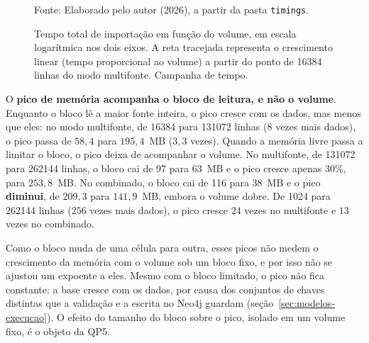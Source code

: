 \begin{figure}[H]
  \centering
  \caption{Tempo total de importação em função do volume, em escala logarítmica nos dois eixos. A reta tracejada representa o crescimento linear (tempo proporcional ao volume) a partir do ponto de \num{16384} linhas do modo multifonte. Campanha de tempo.}
  \label{fig:escala}
  \par\vspace{4pt}
  {\footnotesize Fonte: Elaborado pelo autor (2026), a partir da pasta \texttt{timings}.}
\end{figure}

O \textbf{pico de memória acompanha o bloco de leitura, e não o volume}. Enquanto o bloco
lê a maior fonte inteira, o pico cresce com os dados, mas menos que eles: no modo
multifonte, de \num{16384} para \num{131072} linhas (8 vezes mais dados), o pico passa de
$58{,}4$ para $195{,}4$~MB ($3{,}3$ vezes). Quando a memória livre passa a limitar o bloco, o
pico deixa de acompanhar o volume. No multifonte, de \num{131072} para \num{262144} linhas,
o bloco cai de 97 para 63~MB e o pico cresce apenas $30\%$, para $253{,}8$~MB. No combinado,
o bloco cai de 116 para 38~MB e o pico \textbf{diminui}, de $209{,}3$ para $141{,}9$~MB,
embora o volume dobre. De \num{1024} para \num{262144} linhas ($256$ vezes mais dados), o
pico cresce $24$ vezes no multifonte e $13$ vezes no combinado.

Como o bloco muda de uma célula para outra, esses picos não medem o crescimento da memória
com o volume sob um bloco fixo, e por isso não se ajustou um expoente a eles. Mesmo com o
bloco limitado, o pico não fica constante: a base cresce com os dados, por causa dos
conjuntos de chaves distintas que a validação e a escrita no Neo4j guardam
(seção~\ref{sec:modelos-execucao}). O efeito do tamanho do bloco sobre o pico, isolado em um
volume fixo, é o objeto da QP5.

